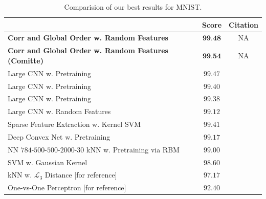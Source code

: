\documentclass[12pt,a4paper,oneside,english]{UPBThesis}
\begin{document}
\renewcommand{\arraystretch}{1.2}
\begin{table}
  \caption{Comparision of our best results for MNIST.}
  \label{table:FinalPerformanceEvaluationMNISTNormal}
  \begin{tabularx}{\textwidth}{|X|cc|}
    \hline
    \centering{Method} & Score & Citation \\
    \hline\hline
    \textbf{Corr and Global Order w. Random Features} & $\textbf{99.48}$ & NA \\
    \textbf{Corr and Global Order w. Random Features (Comitte)} & $\textbf{99.54}$ & NA \\
    Large CNN w. Pretraining & $99.47$ & \cite{best-architecture-object-recognition} \\
    Large CNN w. Pretraining & $99.40$ & \cite{efficient-learning-sparse-energy-model} \\
    Large CNN w. Pretraining & $99.38$ & \cite{unsupervised-learning-invariant-feature-hierarchies} \\
    Large CNN w. Random Features & $99.12$ & \cite{unsupervised-learning-invariant-feature-hierarchies} \\
    Sparse Feature Extraction w. Kernel SVM & $99.41$ & \cite{simple-method-sparse-coding} \\
    Deep Convex Net w. Pretraining & $99.17$ & \cite{mnist-website} \\
    NN $784$-$500$-$500$-$2000$-$30$ kNN w. Pretraining via RBM & $99.00$ & \cite{mnist-website} \\
    SVM w. Gaussian Kernel & $98.60$ & \cite{mnist-website} \\
    kNN w. $\mathcal{L}_3$ Distance [for reference] & $97.17$ & \cite{mnist-website} \\
    One-vs-One Perceptron [for reference] & $92.40$ & \cite{gradient-based-learning} \\
    \hline
  \end{tabularx}
\end{table}
\renewcommand{\arraystretch}{1.0}
\end{document}

